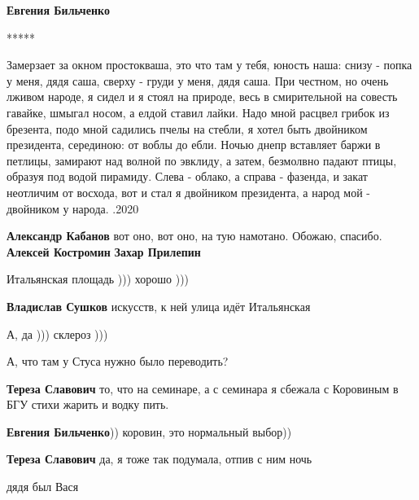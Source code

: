 \begin{itemize}
\begin{itemize}
\textbf{Евгения Бильченко}

*****

\begin{multicols}{2}
\obeycr
Замерзает за окном простокваша,
это что там у тебя, юность наша:
снизу - попка у меня, дядя саша,
сверху - груди у меня, дядя саша.
\smallskip
При честном, но очень лживом народе,
я сидел и я стоял на природе,
весь в смирительной на совесть гавайке,
шмыгал носом, а елдой ставил лайки.
\smallskip
Надо мной расцвел грибок из брезента,
подо мной садились пчелы на стебли,
я хотел быть двойником президента,
серединою: от воблы до ебли.
\smallskip
Ночью днепр вставляет баржи в петлицы,
замирают над волной по эвклиду,
а затем, безмолвно падают птицы,
образуя под водой пирамиду.
\smallskip
Слева - облако, а справа - фазенда,
и закат неотличим от восхода,
вот и стал я двойником президента,
а народ мой - двойником у народа.
.2020
\restorecr
\end{multicols}

\textbf{Александр Кабанов} вот оно, вот оно, на тую намотано. Обожаю, спасибо.
\textbf{Алексей Костромин} \textbf{Захар Прилепин}

\end{itemize} %

Итальянская площадь ))) хорошо )))

\begin{itemize} %
\textbf{Владислав Сушков} искусств, к ней улица идёт Итальянская

А, да ))) склероз )))
\end{itemize} %

А, что там у Стуса нужно было переводить?

\begin{itemize} %
\textbf{Тереза Славович} то, что на семинаре, а с семинара я сбежала с Коровиным в БГУ стихи жарить и водку пить.

\textbf{Евгения Бильченко})) коровин, это нормальный выбор))


\textbf{Тереза Славович} да, я тоже так подумала, отпив с ним ночь
\end{itemize} %

дядя был Вася



\end{itemize} %
